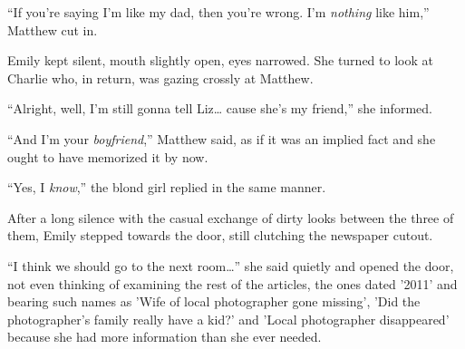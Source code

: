 “If you're saying I'm like my dad, then you're wrong. I'm \textit{nothing} like him,” Matthew cut in.

Emily kept silent, mouth slightly open, eyes narrowed. She turned to look at Charlie who, in return, was gazing crossly at Matthew.

“Alright, well, I'm still gonna tell Liz… cause she's my friend,” she informed.

“And I'm your \textit{boyfriend},” Matthew said, as if it was an implied fact and she ought to have memorized it by now.

“Yes, I \textit{know},” the blond girl replied in the same manner.

After a long silence with the casual exchange of dirty looks between the three of them, Emily stepped towards the door, still clutching the newspaper cutout.

“I think we should go to the next room…” she said quietly and opened the door, not even thinking of examining the rest of the articles, the ones dated '2011' and bearing such names as 'Wife of local photographer gone missing', 'Did the photographer's family really have a kid?' and 'Local photographer disappeared' because she had more information than she ever needed.